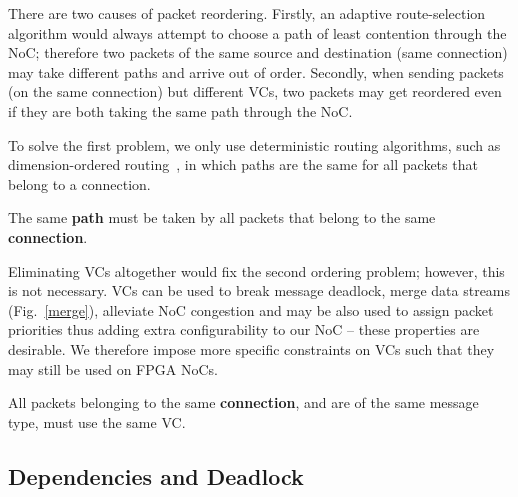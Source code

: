 There are two causes of packet reordering.
Firstly, an adaptive route-selection algorithm would always attempt to choose a path of least contention through the NoC; therefore two packets of the same source and destination (same connection) may take different paths and arrive out of order.
Secondly, when sending packets (on the same connection) but different VCs, two packets may get reordered even if they are both taking the same path through the NoC.

To solve the first problem, we only use deterministic routing algorithms, such as dimension-ordered routing~\cite{dally_book}, in which paths are the same for all packets that belong to a connection.
%
\begin{cond}
\label{routing_constraint}
The same \textbf{path} must be taken by all packets that belong to the same \textbf{connection}.
\end{cond}
%
%
%

Eliminating VCs altogether would fix the second ordering problem; however, this is not necessary.
VCs can be used to break message deadlock, merge data streams (Fig.~\ref{merge}), alleviate NoC congestion and may be also used to assign packet priorities thus adding extra configurability to our NoC -- these properties are desirable.
We therefore impose more specific constraints on VCs such that they may still be used on FPGA NoCs.
%
\begin{cond}
All packets belonging to the same \textbf{connection}, and are of the same message type, must use the same VC.
\end{cond}
%


%
\subsection{Dependencies and Deadlock}
%


